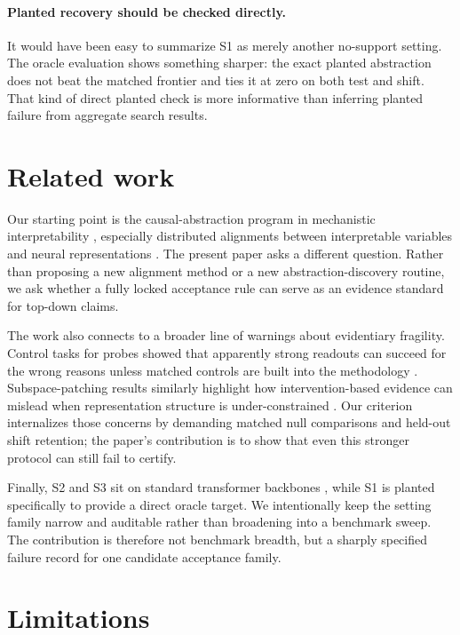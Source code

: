 \documentclass[10pt]{article}
\begin{document}
\paragraph{Planted recovery should be checked directly.}
It would have been easy to summarize S1 as merely another no-support setting. The oracle evaluation shows something sharper: the exact planted abstraction does not beat the matched frontier and ties it at zero on both test and shift. That kind of direct planted check is more informative than inferring planted failure from aggregate search results.

\section{Related work}

Our starting point is the causal-abstraction program in mechanistic interpretability \citep{geiger2023causal}, especially distributed alignments between interpretable variables and neural representations \citep{geiger2024das}. The present paper asks a different question. Rather than proposing a new alignment method or a new abstraction-discovery routine, we ask whether a fully locked acceptance rule can serve as an evidence standard for top-down claims.

The work also connects to a broader line of warnings about evidentiary fragility. Control tasks for probes showed that apparently strong readouts can succeed for the wrong reasons unless matched controls are built into the methodology \citep{hewitt2019designing}. Subspace-patching results similarly highlight how intervention-based evidence can mislead when representation structure is under-constrained \citep{makelov2023subspace}. Our criterion internalizes those concerns by demanding matched null comparisons and held-out shift retention; the paper's contribution is to show that even this stronger protocol can still fail to certify.

Finally, S2 and S3 sit on standard transformer backbones \citep{vaswani2017attention,radford2019language}, while S1 is planted specifically to provide a direct oracle target. We intentionally keep the setting family narrow and auditable rather than broadening into a benchmark sweep. The contribution is therefore not benchmark breadth, but a sharply specified failure record for one candidate acceptance family.

\section{Limitations}
\end{document}
